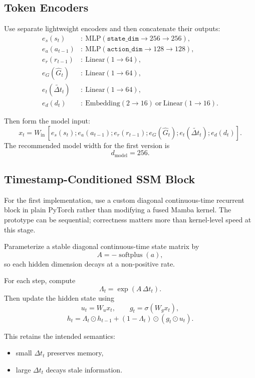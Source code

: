 \documentclass[11pt]{article}
\begin{document}
\subsection{Token Encoders}
Use separate lightweight encoders and then concatenate their outputs:
\begin{align*}
 e_s(s_t) &:\ \text{MLP}(\texttt{state\_dim} \rightarrow 256 \rightarrow 256),\\
 e_a(a_{t-1}) &:\ \text{MLP}(\texttt{action\_dim} \rightarrow 128 \rightarrow 128),\\
 e_r(r_{t-1}) &:\ \text{Linear}(1 \rightarrow 64),\\
 e_G(\widehat{G}_t) &:\ \text{Linear}(1 \rightarrow 64),\\
 e_t(\widetilde{\Delta t}_t) &:\ \text{Linear}(1 \rightarrow 64),\\
 e_d(d_t) &:\ \text{Embedding}(2 \rightarrow 16)\ \text{or}\ \text{Linear}(1 \rightarrow 16).
\end{align*}

Then form the model input:
\[
 x_t = W_{\text{in}}\,[e_s(s_t); e_a(a_{t-1}); e_r(r_{t-1}); e_G(\widehat{G}_t); e_t(\widetilde{\Delta t}_t); e_d(d_t)].
\]
The recommended model width for the first version is
\[
 d_{\text{model}} = 256.
\]

\subsection{Timestamp-Conditioned SSM Block}
For the first implementation, use a custom diagonal continuous-time recurrent block in plain PyTorch rather than modifying a fused Mamba kernel. The prototype can be sequential; correctness matters more than kernel-level speed at this stage.

Parameterize a stable diagonal continuous-time state matrix by
\[
A = -\operatorname{softplus}(a),
\]
so each hidden dimension decays at a non-positive rate.

For each step, compute
\[
\Lambda_t = \exp(A\,\Delta t_t).
\]
Then update the hidden state using
\[
u_t = W_u x_t, \qquad g_t = \sigma(W_g x_t),
\]
\[
h_t = \Lambda_t \odot h_{t-1} + (1-\Lambda_t)\odot (g_t \odot u_t).
\]

This retains the intended semantics:
\begin{itemize}[leftmargin=1.5em]
    \item small $\Delta t_t$ preserves memory,
    \item large $\Delta t_t$ decays stale information.
\end{itemize}
\end{document}
